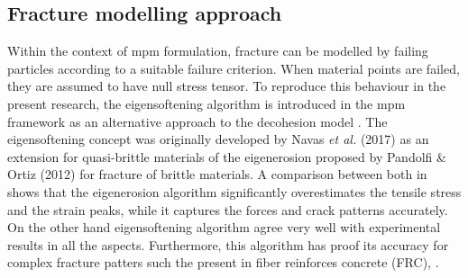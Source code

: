 \documentclass[preprint,12pt,a4paper]{elsarticle}
\begin{document}
\subsection{Fracture modelling approach}
\label{sec:2.3}
Within the context of \acrshort{mpm} formulation, fracture can be
modelled by failing particles according to a suitable failure
criterion. When material points are failed, they are assumed to have
null stress tensor. To reproduce this behaviour in the present
research, the eigensoftening algorithm is introduced in the 
\acrshort{mpm} framework as an alternative approach to the decohesion
model \cite{Zhenmao_2005,Schreyer_2002}. The eigensoftening concept
was originally developed by Navas {\it et al.}
(2017)\cite{Navas_2017_ES} as an extension for quasi-brittle materials
of the eigenerosion proposed by Pandolfi \& Ortiz
(2012)\cite{Pandolfi_2012} for fracture of brittle materials. A
comparison between both in \cite{Navas_2017_ES} shows that the
eigenerosion algorithm significantly overestimates the tensile  
stress and the strain peaks, while it captures the forces and crack
patterns accurately. On the other hand eigensoftening algorithm agree
very well with experimental results in all the aspects. Furthermore,
this algorithm has proof its accuracy for complex fracture
patters such the present in fiber reinforces concrete (FRC),
\cite{Navas_2018_ES}.\\
\end{document}

